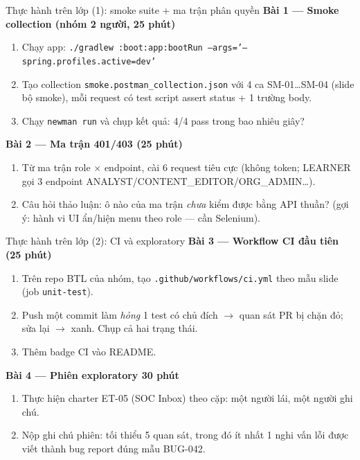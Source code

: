 \documentclass[aspectratio=169,12pt]{beamer}
\begin{document}
\begin{frame}{Thực hành trên lớp (1): smoke suite + ma trận phân quyền}
  \textbf{Bài 1 --- Smoke collection (nhóm 2 người, 25 phút)}
  \begin{enumerate}
    \item Chạy app: \texttt{./gradlew :boot:app:bootRun --args='--spring.profiles.active=dev'}
    \item Tạo collection \texttt{smoke.postman\_collection.json} với 4 ca SM-01\ldots SM-04 (slide bộ smoke), mỗi request có test script assert status + 1 trường body.
    \item Chạy \texttt{newman run} và chụp kết quả: 4/4 pass trong bao nhiêu giây?
  \end{enumerate}
  \textbf{Bài 2 --- Ma trận 401/403 (25 phút)}
  \begin{enumerate}
    \item Từ ma trận role $\times$ endpoint, cài 6 request tiêu cực (không token; LEARNER gọi 3 endpoint ANALYST/CONTENT\_EDITOR/ORG\_ADMIN\ldots).
    \item Câu hỏi thảo luận: ô nào của ma trận \emph{chưa} kiểm được bằng API thuần? (gợi ý: hành vi UI ẩn/hiện menu theo role --- cần Selenium).
  \end{enumerate}
\end{frame}

\begin{frame}{Thực hành trên lớp (2): CI và exploratory}
  \textbf{Bài 3 --- Workflow CI đầu tiên (25 phút)}
  \begin{enumerate}
    \item Trên repo BTL của nhóm, tạo \texttt{.github/workflows/ci.yml} theo mẫu slide (job \texttt{unit-test}).
    \item Push một commit làm \emph{hỏng} 1 test có chủ đích $\rightarrow$ quan sát PR bị chặn đỏ; sửa lại $\rightarrow$ xanh. Chụp cả hai trạng thái.
    \item Thêm badge CI vào README.
  \end{enumerate}
  \textbf{Bài 4 --- Phiên exploratory 30 phút}
  \begin{enumerate}
    \item Thực hiện charter ET-05 (SOC Inbox) theo cặp: một người lái, một người ghi chú.
    \item Nộp ghi chú phiên: tối thiểu 5 quan sát, trong đó ít nhất 1 nghi vấn lỗi được viết thành bug report đúng mẫu BUG-042.
  \end{enumerate}
\end{frame}
\end{document}
